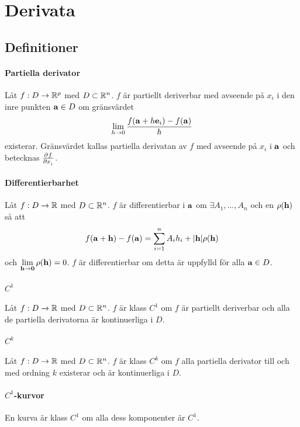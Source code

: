 \section{Derivata}

\subsection{Definitioner}

\paragraph{Partiella derivator}
Låt $f: D\to\mathbb{R}^p$ med $D\subset\mathbb{R}^n$. $f$ är partiellt deriverbar med avseende på $x_i$ i den inre punkten $\vect{a}\in D$ om gränsvärdet
\begin{align*}
	\limit{h}{0}\frac{f(\vect{a} + h\vect{e}_i) - f(\vect{a})}{h}
\end{align*}
existerar. Gränsvärdet kallas partiella derivatan av $f$ med avseende på $x_i$ i $\vect{a}$ och betecknas $\pdeval{f}{x_i}{\vect{a}}$.

\paragraph{Differentierbarhet}
Låt $f: D\to\mathbb{R}$ med $D\subset\mathbb{R}^n$. $f$ är differentierbar i $\vect{a}$ om $\exists A_1, \dots, A_n$ och en $\rho(\vect{h})$ så att
\begin{align*}
	f(\vect{a} + \vect{h}) - f(\vect{a}) = \sum\limits_{i = 1}^{n}A_ih_i + \abs{\vect{h}}\rho(\vect{h})
\end{align*}
och $\limit{\vect{h}}{\vect{0}}\rho(\vect{h}) = 0$. $f$ är differentierbar om detta är uppfylld för alla $\vect{a}\in D$.

\paragraph{$C^1$}
Låt $f: D\to\mathbb{R}$ med $D\subset\mathbb{R}^n$. $f$ är klass $C^1$ om $f$ är partiellt deriverbar och alla de partiella derivatorna är kontinuerliga i $D$.

\paragraph{$C^k$}
Låt $f: D\to\mathbb{R}$ med $D\subset\mathbb{R}^n$. $f$ är klass $C^k$ om $f$ alla partiella derivator till och med ordning $k$ existerar och är kontinuerliga i $D$.

\paragraph{$C^1$-kurvor}
En kurva är klass $C^1$ om alla dess komponenter är $C^1$.

